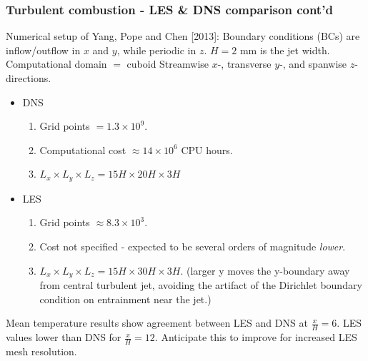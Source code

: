 \documentclass{beamer}
\begin{document}
\begin{frame}%
\frametitle{Turbulent combustion - LES \& DNS comparison cont'd}
Numerical setup of Yang, Pope and Chen [2013]:\newline
\tiny{
Boundary conditions (BCs) are inflow/outflow in $x$ and $y$, while periodic in $z$.\newline
$H = 2$ mm is the jet width.}\newline
Computational domain $=$ cuboid\newline
Streamwise $x$-, transverse $y$-, and spanwise $z$-directions.
\begin{itemize}
\scriptsize
\item DNS 
\begin{enumerate}[(1)]
\scriptsize
\item Grid points $ = 1.3 \times 10^9$.  
\item Computational cost $\approx 14 \times 10^6$ CPU hours.
\item $L_x \times L_y \times L_z = 15H \times 20H \times 3H$ 
\end{enumerate}
\item LES
\begin{enumerate}[(1)]
\scriptsize
\item Grid points $ \approx 8.3 \times 10^3$.  
\item Cost not specified - expected to be several orders of magnitude \textit{lower}.
\item $ L_x \times L_y \times L_z = 15H \times 30H \times 3H$. \newline \tiny{(larger y moves the y-boundary away from central turbulent jet, avoiding the artifact of the Dirichlet boundary condition on entrainment near the jet.)}
\end{enumerate}
\end{itemize}
\vspace{10pt}
\scriptsize
Mean temperature results show agreement between LES and DNS at $\frac{x}{H} = 6$. \newline LES values lower than DNS for $\frac{x}{H} = 12$.\newline
Anticipate this to improve for increased LES mesh resolution.

\end{frame}
\end{document}

